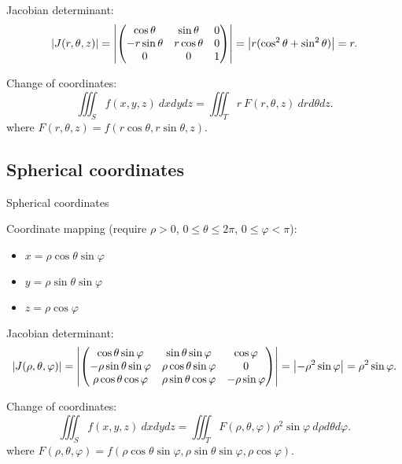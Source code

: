 Jacobian determinant:
\[
    \left|J(r,\theta,z)\right|
    =
    \left|\begin{pmatrix}
            \cos \theta    & \sin \theta   & 0 \\
            -r \sin \theta & r \cos \theta & 0 \\
            0              & 0             & 1
        \end{pmatrix}\right|
    =
    \left|r (\cos^2 \theta + \sin^2 \theta)\right|
    = r.
\]

Change of coordinates:
\[
    \iiint_{S} f(x,y,z) \ dxdydz =  \iiint_{T} r \ F(r,\theta,z)   \ dr d\theta dz.
\]
where \( F(r,\theta,z) = f(r \cos \theta, r \sin \theta,  z) \).




\subsection{Spherical coordinates}


{Spherical coordinates}

Coordinate mapping (require \(\rho>0\), \(0\leq \theta \leq 2\pi\), \(0\leq \varphi <\pi\)):
\begin{itemize}
    \item \(x = \rho \cos \theta \sin \varphi\)
    \item \(y = \rho \sin \theta \sin \varphi\)
    \item \(z = \rho \cos \varphi\)
\end{itemize}



Jacobian determinant:
\[
    \left|J(\rho,\theta,\varphi)\right|
    =
    \left|\begin{pmatrix}
            \cos \theta \sin \varphi       & \sin \theta \sin \varphi      & \cos \varphi        \\
            -\rho \sin \theta \sin \varphi & \rho \cos \theta \sin \varphi & 0                   \\
            \rho \cos \theta \cos \varphi  & \rho \sin \theta \cos \varphi & - \rho \sin \varphi
        \end{pmatrix}\right|
    =
    \left|- \rho^2 \sin \varphi\right|
    = \rho^2 \sin \varphi.
\]

Change of coordinates:
\[
    \iiint_{S} f(x,y,z) \ dxdydz =  \iiint_{T}  F(\rho,\theta,\varphi) \rho^2 \sin \varphi  \ d\rho d\theta d\varphi.
\]
where \(F(\rho,\theta,\varphi) = f(\rho \cos \theta \sin \varphi, \rho \sin \theta \sin \varphi,   \rho \cos \varphi  ) \).